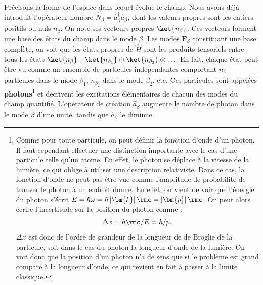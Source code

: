 Précisons la forme de l'espace dans lequel évolue le champ. Nous avons déjà introduit l'opérateur nombre $\hat{N}_{\beta}=\hat{a}^{\dag}_{\beta}\hat{a}_{\beta}$, dont les valeurs propres sont les entiers positifs ou nuls $n_{\beta}$. On note ses vecteurs propres $\ket{n_{\beta}}$. Ces vecteurs forment une base des états du champ dans le mode ${\beta}$. Les modes $\bm{F}_{\beta}$ constituant une base complète, on voit que les états propres de $\hat{H}$ sont les produits tensoriels entre tous les états $\ket{n_{\beta}}$ : $\ket{n_{\beta_1}}\otimes\ket{n_{\beta_2}}\otimes\ldots$. En fait, chaque état peut être vu comme un ensemble de particules indépendantes comportant $n_{\beta_1}$ particules dans le mode ${\beta_1}$, $n_{\beta_2}$ dans le mode ${\beta_2}$, etc. Ces particules sont appelées \textbf{photons}\footnote{Comme pour toute particule, on peut définir la fonction d'onde d'un photon. Il faut cependant effectuer une distinction importante avec le cas d'une particule telle qu'un atome. En effet, le photon se déplace à la vitesse de la lumière, ce qui oblige à utiliser une description relativiste. Dans ce cas, la fonction d'onde ne peut pas être vue comme l'amplitude de probabilité de trouver le photon à un endroit donné. En effet, on vient de voir que l'énergie du photon s'écrit $E = \hbar\omega = \hbar\left|\bm{k}\right|\rmc=\left|\bm{p}\right|\rmc$. On peut alors écrire l'incertitude sur la position du photon comme :
\begin{equation*}
\Delta x \sim \hbar\rmc/E = \hbar/p.
\end{equation*}
$\Delta x$ est donc de l'ordre de grandeur de la longueur de de Broglie de la particule, soit dans le cas du photon la longueur d'onde de la lumière. On voit donc que la position d'un photon n'a de sens que si le problème est grand comparé à la longueur d'onde, ce qui revient en fait à passer à la limite classique.} et décrivent les excitations élémentaires de chacun des modes du champ quantifié. L'opérateur de création $\hat{a}^{\dag}_{\beta}$ augmente le nombre de photon dans le mode ${\beta}$ d'une unité, tandis que $\hat{a}_{\beta}$ le diminue.

